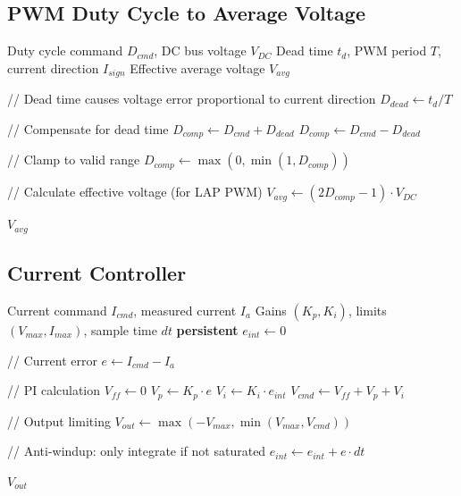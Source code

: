 \subsection{PWM Duty Cycle to Average Voltage}

\begin{algorithm}
\caption{H-Bridge PWM with Dead Time Compensation}
\begin{algorithmic}[1]
\REQUIRE Duty cycle command $D_{cmd}$, DC bus voltage $V_{DC}$
\REQUIRE Dead time $t_d$, PWM period $T$, current direction $I_{sign}$
\ENSURE Effective average voltage $V_{avg}$

\STATE // Dead time causes voltage error proportional to current direction
\STATE $D_{dead} \gets t_d / T$

\STATE // Compensate for dead time
    \STATE $D_{comp} \gets D_{cmd} + D_{dead}$
\ELSE
    \STATE $D_{comp} \gets D_{cmd} - D_{dead}$
\ENDIF

\STATE // Clamp to valid range
\STATE $D_{comp} \gets \max(0, \min(1, D_{comp}))$

\STATE // Calculate effective voltage (for LAP PWM)
\STATE $V_{avg} \gets (2 D_{comp} - 1) \cdot V_{DC}$

\RETURN $V_{avg}$
\end{algorithmic}
\end{algorithm}

\subsection{Current Controller}

\begin{algorithm}
\caption{PI Current Controller with Anti-Windup}
\begin{algorithmic}[1]
\REQUIRE Current command $I_{cmd}$, measured current $I_a$
\REQUIRE Gains $(K_p, K_i)$, limits $(V_{max}, I_{max})$, sample time $dt$
\STATE \textbf{persistent} $e_{int} \gets 0$ 

\STATE // Current error
\STATE $e \gets I_{cmd} - I_a$

\STATE // PI calculation
\STATE $V_{ff} \gets 0$ 
\STATE $V_p \gets K_p \cdot e$
\STATE $V_i \gets K_i \cdot e_{int}$
\STATE $V_{cmd} \gets V_{ff} + V_p + V_i$

\STATE // Output limiting
\STATE $V_{out} \gets \max(-V_{max}, \min(V_{max}, V_{cmd}))$

\STATE // Anti-windup: only integrate if not saturated
    \STATE $e_{int} \gets e_{int} + e \cdot dt$
\ENDIF

\RETURN $V_{out}$
\end{algorithmic}
\end{algorithm}

